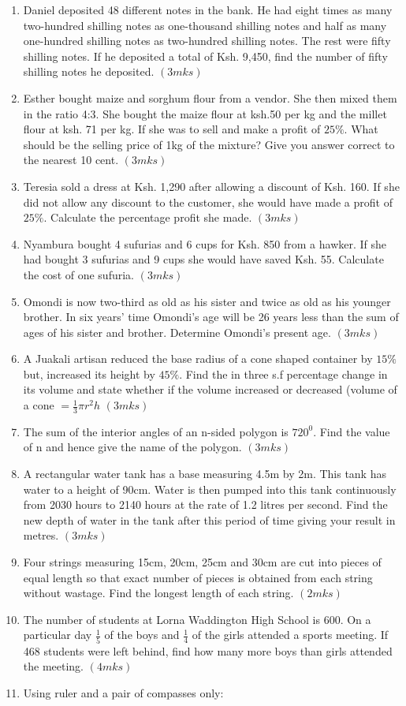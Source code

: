 \documentclass[
  a4paperpaper,
]{scrbook}
\begin{document}
\begin{tcolorbox}
\begin{enumerate}
\def\labelenumi{\arabic{enumi}.}
\setcounter{enumi}{5}
\item
  Daniel deposited 48 different notes in the bank. He had eight times as
  many two-hundred shilling notes as one-thousand shilling notes and
  half as many one-hundred shilling notes as two-hundred shilling notes.
  The rest were fifty shilling notes. If he deposited a total of Ksh.
  9,450, find the number of fifty shilling notes he deposited.
  \((3mks)\)
\item
  Esther bought maize and sorghum flour from a vendor. She then mixed
  them in the ratio 4:3. She bought the maize flour at ksh.50 per kg and
  the millet flour at ksh. 71 per kg. If she was to sell and make a
  profit of \(25\%\). What should be the selling price of 1kg of the
  mixture? Give you answer correct to the nearest 10 cent. \((3mks)\)
\item
  Teresia sold a dress at Ksh. 1,290 after allowing a discount of Ksh.
  160. If she did not allow any discount to the customer, she would have
  made a profit of \(25\%\). Calculate the percentage profit she made.
  \((3mks)\)
\item
  Nyambura bought 4 sufurias and 6 cups for Ksh. 850 from a hawker. If
  she had bought 3 sufurias and 9 cups she would have saved Ksh. 55.
  Calculate the cost of one sufuria. \((3mks)\)
\item
  Omondi is now two-third as old as his sister and twice as old as his
  younger brother. In six years' time Omondi's age will be 26 years less
  than the sum of ages of his sister and brother. Determine Omondi's
  present age. \((3mks)\)
\item
  A Juakali artisan reduced the base radius of a cone shaped container
  by \(15\%\) but, increased its height by \(45\%\). Find the in three
  s.f percentage change in its volume and state whether if the volume
  increased or decreased (volume of a cone \(=\frac{1}{3}\pi r^2h\)
  \((3mks)\)
\item
  The sum of the interior angles of an n-sided polygon is \(720^0\).
  Find the value of n and hence give the name of the polygon. \((3mks)\)
\item
  A rectangular water tank has a base measuring 4.5m by 2m. This tank
  has water to a height of 90cm. Water is then pumped into this tank
  continuously from 2030 hours to 2140 hours at the rate of 1.2 litres
  per second. Find the new depth of water in the tank after this period
  of time giving your result in metres. \((3mks)\)
\item
  Four strings measuring 15cm, 20cm, 25cm and 30cm are cut into pieces
  of equal length so that exact number of pieces is obtained from each
  string without wastage. Find the longest length of each string.
  \((2mks)\)
\item
  The number of students at Lorna Waddington High School is 600. On a
  particular day \(\frac{1}{5}\) of the boys and \(\frac{1}{4}\) of the
  girls attended a sports meeting. If 468 students were left behind,
  find how many more boys than girls attended the meeting. \((4mks)\)
\item
  Using ruler and a pair of compasses only:


\end{enumerate}
\end{tcolorbox}
\end{document}

